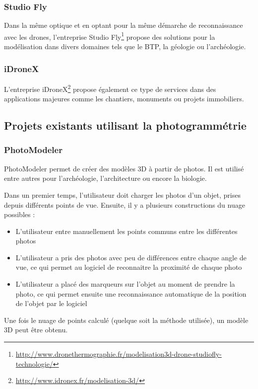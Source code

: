 \documentclass[12pt, openany]{report}
\begin{document}
\subsubsection{Studio Fly}
Dans la même optique et en optant pour la même démarche de reconnaissance avec les drones, l'entreprise Studio Fly\footnote{\url{http://www.dronethermographie.fr/modelisation3d-drone-studiofly-technologie/}} propose des solutions pour la modélisation dans divers domaines tels que le BTP, la géologie ou l'archéologie.

\subsubsection{iDroneX}
L'entreprise iDroneX\footnote{\url{http://www.idronex.fr/modelisation-3d/}} propose également ce type de services dans des applications majeures comme les chantiers, monuments ou projets immobiliers.

\subsection{Projets existants utilisant la photogrammétrie}

\subsubsection{PhotoModeler}
PhotoModeler permet de créer des modèles 3D à partir de photos. Il est utilisé entre autres pour l'archéologie, l'architecture ou encore la biologie.

Dans un premier temps, l'utilisateur doit charger les photos d'un objet, prises depuis différents points de vue. Ensuite, il y a plusieurs constructions du nuage possibles :
\begin{itemize}
\item L'utilisateur entre manuellement les points communs entre les différentes photos
\item L'utilisateur a pris des photos avec peu de différences entre chaque angle de vue, ce qui permet au logiciel de reconnaitre la proximité de chaque photo
\item L'utilisateur a placé des marqueurs sur l'objet au moment de prendre la photo, ce qui permet ensuite une reconnaissance automatique de la position de l'objet par le logiciel
\end{itemize}
Une fois le nuage de points calculé (quelque soit la méthode utilisée), un modèle 3D peut être obtenu.
\end{document}
